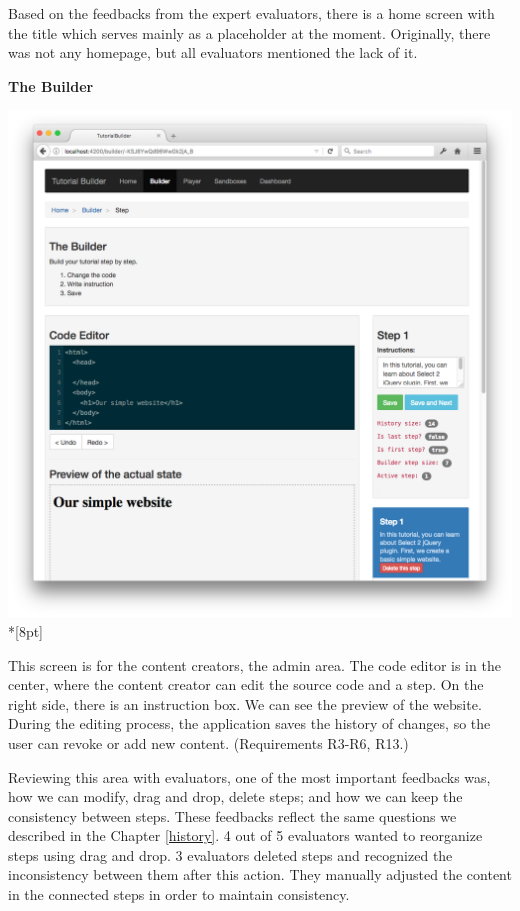 \documentclass[11pt, a4paper, oneside, openright, medskipamount]{report}
\begin{document}
Based on the feedbacks from the expert evaluators, there is a home screen with the title which serves mainly as a placeholder at the moment. Originally, there was not any homepage, but all evaluators mentioned the lack of it.

\newpage

\textbf{The Builder}

\includegraphics[width=1\textwidth]{assets/tour-screenshots/the-builder.png}\\*[8pt]

This screen is for the content creators, the admin area. The code editor is in the center, where the content creator can edit the source code and a step. On the right side, there is an instruction box. We can see the preview of the website. During the editing process, the application saves the history of changes, so the user can revoke or add new content. (Requirements R3-R6, R13.)

Reviewing this area with evaluators, one of the most important feedbacks was, how we can modify, drag and drop, delete steps; and how we can keep the consistency between steps. These feedbacks reflect the same questions we described in the Chapter \ref{history}. 4 out of 5 evaluators wanted to reorganize steps using drag and drop. 3 evaluators deleted steps and recognized the inconsistency between them  after this action. They manually adjusted the content in the connected steps in order to maintain consistency.
\end{document}

